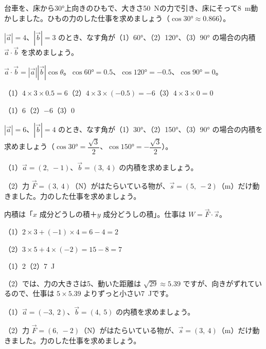 \begin{jibun}
台車を、床から30°上向きのひもで、大きさ\qty{50}{N}の力で引き、床にそって\qty{8}{m}動かしました。ひもの力のした仕事を求めましょう（$\cos30°\approx0.866$）。
\end{jibun}

\begin{reidai}[大きさと角から内積を求める]
$|\vec{a}|=4$、$|\vec{b}|=3$ のとき、なす角が（1）60°、（2）120°、（3）90° の場合の内積 $\vec{a}\cdot\vec{b}$ を求めましょう。\par
\kangaekata $\vec{a}\cdot\vec{b}=|\vec{a}||\vec{b}|\cos\theta$。$\cos60°=0.5$、$\cos120°=-0.5$、$\cos90°=0$。\par
\shiki（1）$4\times3\times0.5=6$\quad（2）$4\times3\times(-0.5)=-6$\quad（3）$4\times3\times0=0$\par
\kotae （1）6\quad（2）$-6$\quad（3）0
\end{reidai}

\begin{jibun}
$|\vec{a}|=6$、$|\vec{b}|=4$ のとき、なす角が（1）30°、（2）150°、（3）90° の場合の内積を求めましょう（$\cos30°=\dfrac{\sqrt3}{2}$、$\cos150°=-\dfrac{\sqrt3}{2}$）。
\end{jibun}

\begin{reidai}[成分で内積と仕事を求める]
（1）$\vec{a}=(2,\ -1)$、$\vec{b}=(3,\ 4)$ の内積を求めましょう。\par
（2）力 $\vec{F}=(3,\ 4)$（N）がはたらいている物が、$\vec{s}=(5,\ -2)$（m）だけ動きました。力のした仕事を求めましょう。\par
\kangaekata 内積は「$x$ 成分どうしの積＋$y$ 成分どうしの積」。仕事は $W=\vec{F}\cdot\vec{s}$。\par
\shiki（1）$2\times3+(-1)\times4=6-4=2$\par
\hspace*{2.6\zw}（2）$3\times5+4\times(-2)=15-8=7$\par
\kotae （1）2\quad（2）\qty{7}{J}
\end{reidai}
（2）では、力の大きさは5、動いた距離は $\sqrt{29}\approx5.39$ ですが、向きがずれているので、仕事は $5\times5.39$ よりずっと小さい\qty{7}{J}です。

\begin{jibun}
（1）$\vec{a}=(-3,\ 2)$、$\vec{b}=(4,\ 5)$ の内積を求めましょう。\par
（2）力 $\vec{F}=(6,\ -2)$（N）がはたらいている物が、$\vec{s}=(3,\ 4)$（m）だけ動きました。力のした仕事を求めましょう。
\end{jibun}

